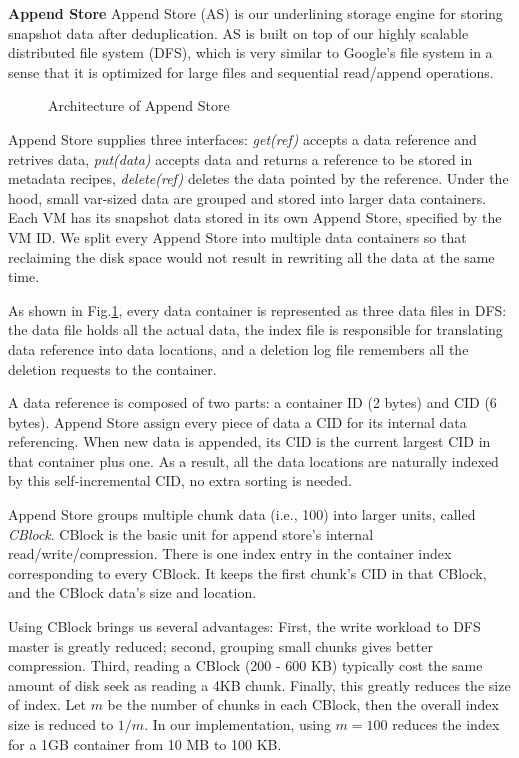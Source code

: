 {\bf Append Store}
Append Store (AS) is our underlining storage engine for storing snapshot data after deduplication. 
AS is built on top of our highly scalable distributed file system (DFS), 
which is very similar to Google's file system
in a sense that it is optimized for large files and sequential read/append operations.

\begin{figure}[htbp]
  \centering
  \caption{Architecture of Append Store}
  \label{fig:as_arch}
\end{figure}

Append Store supplies three interfaces: {\em get(ref)} accepts a data reference and retrives data, 
{\em put(data)} accepts data and returns a reference to be stored in metadata recipes, 
{\em delete(ref)} 
deletes the data pointed by the reference.
Under the hood, small var-sized data are grouped and stored into larger data containers. Each VM has
its snapshot data stored in its own Append Store, specified by the VM ID. 
We split every Append Store into multiple data containers so that reclaiming the disk space would not 
result in rewriting all the data at the same time.

As shown in Fig.\ref{fig:as_arch}, every data container is represented as three data files in DFS:
the data file holds all the actual data, the index file is responsible for translating data reference
into data locations, and a deletion log file remembers all the deletion requests to the container.

A data reference is composed of two parts: a container ID (2 bytes) and CID (6 bytes).
Append Store assign every piece of data a CID for its internal data referencing. 
When new data is appended, its CID is the current largest CID in that container plus one.
As a result, all the data locations are naturally indexed by this self-incremental CID, 
no extra sorting is needed.

Append Store groups multiple chunk data (i.e., 100) into larger units, called {\em CBlock}.
CBlock is the basic unit for append store's internal read/write/compression.
There is one index entry in the container index corresponding to every CBlock. It keeps the first chunk's CID
in that CBlock, and the CBlock data's size and location.

Using CBlock brings us several advantages: First, the write workload to DFS master is greatly reduced; second, grouping
small chunks gives better compression. Third, reading a CBlock (200 - 600 KB) typically cost the same amount of disk 
seek as reading a 4KB chunk. Finally, this greatly reduces the size of index. Let $m$ be the number of chunks in each
CBlock, then the overall index size is reduced to $1/m$. In our implementation, using $m=100$ reduces the index for
a 1GB container from 10 MB to 100 KB.

